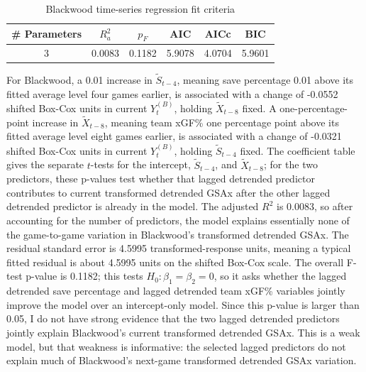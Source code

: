 \documentclass[
  10pt,
]{extarticle}
\newcounter{none} %
\begin{document}
\begin{center}
\scriptsize
\begin{table}[H]

\caption{\label{tab:p1-blackwood-reg-fit}Blackwood time-series regression fit criteria}
\centering
\begin{tabular}[t]{cccccc}
\toprule
\# Parameters & $R_a^2$ & $p_F$ & AIC & AICc & BIC\\
\midrule
3 & 0.0083 & 0.1182 & 5.9078 & 4.0704 & 5.9601\\
\bottomrule
\end{tabular}
\end{table}
\normalsize
\end{center}

For Blackwood, a 0.01 increase in \(\tilde{S}_{t-4}\), meaning save percentage 0.01 above its fitted average level four games earlier, is associated with a change of -0.0552 shifted Box-Cox units in current \(Y^{(B)}_t\), holding \(\tilde{X}_{t-8}\) fixed. A one-percentage-point increase in \(\tilde{X}_{t-8}\), meaning team xGF\% one percentage point above its fitted average level eight games earlier, is associated with a change of -0.0321 shifted Box-Cox units in current \(Y^{(B)}_t\), holding \(\tilde{S}_{t-4}\) fixed. The coefficient table gives the separate \(t\)-tests for the intercept, \(\tilde{S}_{t-4}\), and \(\tilde{X}_{t-8}\); for the two predictors, these p-values test whether that lagged detrended predictor contributes to current transformed detrended GSAx after the other lagged detrended predictor is already in the model. The adjusted \(R^2\) is 0.0083, so after accounting for the number of predictors, the model explains essentially none of the game-to-game variation in Blackwood's transformed detrended GSAx. The residual standard error is 4.5995 transformed-response units, meaning a typical fitted residual is about 4.5995 units on the shifted Box-Cox scale. The overall F-test p-value is 0.1182; this tests \(H_0:\beta_1=\beta_2=0\), so it asks whether the lagged detrended save percentage and lagged detrended team xGF\% variables jointly improve the model over an intercept-only model. Since this p-value is larger than 0.05, I do not have strong evidence that the two lagged detrended predictors jointly explain Blackwood's current transformed detrended GSAx. This is a weak model, but that weakness is informative: the selected lagged predictors do not explain much of Blackwood's next-game transformed detrended GSAx variation.
\end{document}
